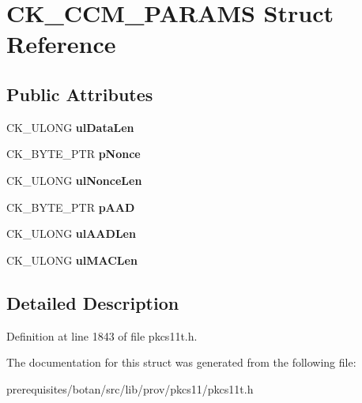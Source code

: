 \hypertarget{struct_c_k___c_c_m___p_a_r_a_m_s}{}\section{C\+K\+\_\+\+C\+C\+M\+\_\+\+P\+A\+R\+A\+MS Struct Reference}
\label{struct_c_k___c_c_m___p_a_r_a_m_s}
\subsection*{Public Attributes}
\begin{DoxyCompactItemize}
\item 
\mbox{\label{struct_c_k___c_c_m___p_a_r_a_m_s_ae9ec7e937591d68717b5ff67caf90a01}} 
C\+K\+\_\+\+U\+L\+O\+NG {\bfseries ul\+Data\+Len}
\item 
\mbox{\label{struct_c_k___c_c_m___p_a_r_a_m_s_a1bbd562ff81b179469bb78b3b6b7b30e}} 
C\+K\+\_\+\+B\+Y\+T\+E\+\_\+\+P\+TR {\bfseries p\+Nonce}
\item 
\mbox{\label{struct_c_k___c_c_m___p_a_r_a_m_s_a65b1faec3bf71987b3bd543008c2c553}} 
C\+K\+\_\+\+U\+L\+O\+NG {\bfseries ul\+Nonce\+Len}
\item 
\mbox{\label{struct_c_k___c_c_m___p_a_r_a_m_s_aa74a1780a01e73aa9e37644d6c972d43}} 
C\+K\+\_\+\+B\+Y\+T\+E\+\_\+\+P\+TR {\bfseries p\+A\+AD}
\item 
\mbox{\label{struct_c_k___c_c_m___p_a_r_a_m_s_a1c0f96ea1b270545d2bbcce571410c32}} 
C\+K\+\_\+\+U\+L\+O\+NG {\bfseries ul\+A\+A\+D\+Len}
\item 
\mbox{\label{struct_c_k___c_c_m___p_a_r_a_m_s_a893590a9361df0b99a2d79de1bde1230}} 
C\+K\+\_\+\+U\+L\+O\+NG {\bfseries ul\+M\+A\+C\+Len}
\end{DoxyCompactItemize}


\subsection{Detailed Description}


Definition at line 1843 of file pkcs11t.\+h.



The documentation for this struct was generated from the following file\+:\begin{DoxyCompactItemize}
\item 
prerequisites/botan/src/lib/prov/pkcs11/pkcs11t.\+h\end{DoxyCompactItemize}
